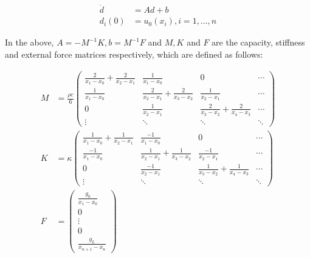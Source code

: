 \documentclass[oribibl]{llncs/llncs}
\begin{document}
\begin{equation}\label{eq:fem}
    \begin{aligned}
        \dot{d} &= A d + b \\
        d_i(0) &= u_0(x_i), i = 1,...,n
    \end{aligned}
\end{equation}

In the above, $A = -M^{-1}K, b = M^{-1} F$ and $M, K$ and $F$ are the capacity,
stiffness and external force matrices respectively, which are defined as
follows:

\begin{equation}
    \begin{aligned}
        M &= \frac{\rho c}{6} \begin{pmatrix}
            \frac{2}{x_1 - x_0} + \frac{2}{x_2 - x_1} & \frac{1}{x_1 - x_0}  & 0 & \cdots \\ 
            \frac{1}{x_1 - x_0} & \frac{2}{x_2 - x_1} + \frac{2}{x_3 - x_2} & \frac{1}{x_2 - x_1}  & \cdots \\ 
            0 & \frac{1}{x_2 - x_1} & \frac{2}{x_3 - x_2} + \frac{2}{x_4 - x_3} &  \cdots \\ 
            \vdots & \ddots & \ddots & \ddots 
        \end{pmatrix}  \\
        K &= \kappa \begin{pmatrix}
            \frac{1}{x_1 - x_0} + \frac{1}{x_2 - x_1} & \frac{-1}{x_1 - x_0}  & 0 & \cdots \\ 
            \frac{-1}{x_1 - x_0} & \frac{1}{x_2 - x_1} + \frac{1}{x_3 - x_2} & \frac{-1}{x_2 - x_1}  & \cdots \\ 
            0 & \frac{-1}{x_2 - x_1} & \frac{1}{x_3 - x_2} + \frac{1}{x_4 - x_3} &  \cdots \\ 
            \vdots & \ddots & \ddots & \ddots 
        \end{pmatrix} \\
        F &= \begin{pmatrix}
            \frac{g_0}{x_1 - x_0} \\
            0 \\
            \vdots \\
            0 \\
            \frac{g_L}{x_{n+1} - x_{n}}
        \end{pmatrix} 
    \end{aligned}
\end{equation}
\end{document}

